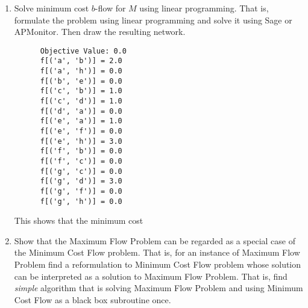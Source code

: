 \documentclass[11pt, oneside]{article}
\begin{document}
\begin{enumerate}
  \item %
    Solve minimum cost $b$-flow for $M$ using linear programming.
    That is, formulate the problem using linear programming and solve it
    using Sage or APMonitor. Then draw the resulting network.

    
    \begin{verbatim}
      Objective Value: 0.0
      f[('a', 'b')] = 2.0
      f[('a', 'h')] = 0.0
      f[('b', 'e')] = 0.0
      f[('c', 'b')] = 1.0
      f[('c', 'd')] = 1.0
      f[('d', 'a')] = 0.0
      f[('e', 'a')] = 1.0
      f[('e', 'f')] = 0.0
      f[('e', 'h')] = 3.0
      f[('f', 'b')] = 0.0
      f[('f', 'c')] = 0.0
      f[('g', 'c')] = 0.0
      f[('g', 'd')] = 3.0
      f[('g', 'f')] = 0.0
      f[('g', 'h')] = 0.0
    \end{verbatim}
    This shows that the minimum cost 
    \begin{center}
    \end{center}

  \item %
    Show that the Maximum Flow Problem can be regarded as a special case of the
    Minimum Cost Flow problem.
    That is, for an instance of Maximum Flow Problem find a reformulation to
    Minimum Cost Flow problem whose solution can be interpreted as a solution to
    Maximum Flow Problem.
    That is, find \emph{simple} algorithm that is solving Maximum Flow Problem
    and using Minimum Cost Flow as a black box subroutine once.
\end{enumerate}
\end{document}
